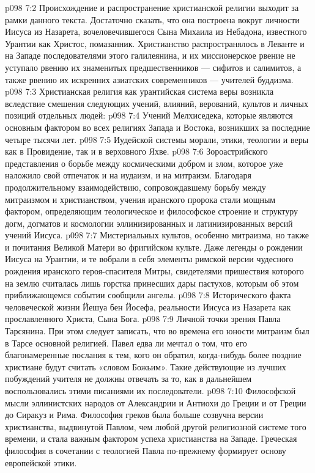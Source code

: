 \vs p098 7:2 Происхождение и распространение христианской религии выходит за рамки данного текста. Достаточно сказать, что она построена вокруг личности Иисуса из Назарета, вочеловечившегося Сына Михаила из Небадона, известного Урантии как Христос, помазанник. Христианство распространялось в Леванте и на Западе последователями этого галилеянина, и их миссионерское рвение не уступало рвению их знаменитых предшественников --- сифитов и салимитов, а также рвению их искренних азиатских современников --- учителей буддизма.
\vs p098 7:3 Христианская религия как урантийская система веры возникла вследствие смешения следующих учений, влияний, верований, культов и личных позиций отдельных людей:
\vs p098 7:4 \bibnobreakspace Учений Мелхиседека, которые являются основным фактором во всех религиях Запада и Востока, возникших за последние четыре тысячи лет.
\vs p098 7:5 \bibnobreakspace Иудейской системы морали, этики, теологии и веры как в Провидение, так и в верховного Яхве.
\vs p098 7:6 \bibnobreakspace Зороастрийского представления о борьбе между космическими добром и злом, которое уже наложило свой отпечаток и на иудаизм, и на митраизм. Благодаря продолжительному взаимодействию, сопровождавшему борьбу между митраизмом и христианством, учения иранского пророка стали мощным фактором, определяющим теологическое и философское строение и структуру догм, догматов и космологии эллинизированных и латинизированных версий учений Иисуса.
\vs p098 7:7 \bibnobreakspace Мистериальных культов, особенно митраизма, но также и почитания Великой Матери во фригийском культе. Даже легенды о рождении Иисуса на Урантии, и те вобрали в себя элементы римской версии чудесного рождения иранского героя\hyp{}спасителя Митры, свидетелями пришествия которого на землю считалась лишь горстка принесших дары пастухов, которым об этом приближающемся событии сообщили ангелы.
\vs p098 7:8 \bibnobreakspace Исторического факта человеческой жизни Йешуа бен Йосефа, реальности Иисуса из Назарета как прославленного Христа, Сына Бога.
\vs p098 7:9 \bibnobreakspace Личной точки зрения Павла Тарсянина. При этом следует записать, что во времена его юности митраизм был в Тарсе основной религией. Павел едва ли мечтал о том, что его благонамеренные послания к тем, кого он обратил, когда\hyp{}нибудь более поздние христиане будут считать «словом Божьим». Такие действующие из лучших побуждений учителя не должны отвечать за то, как в дальнейшем воспользовались этими писаниями их последователи.
\vs p098 7:10 \bibnobreakspace Философской мысли эллинистских народов от Александрии и Антиохи до Греции и от Греции до Сиракуз и Рима. Философия греков была больше созвучна версии христианства, выдвинутой Павлом, чем любой другой религиозной системе того времени, и стала важным фактором успеха христианства на Западе. Греческая философия в сочетании с теологией Павла по\hyp{}прежнему формирует основу европейской этики.

